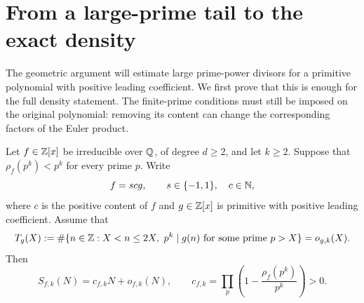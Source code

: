 \section{From a large-prime tail to the exact density}
\label{sec:sieve}

The geometric argument will estimate large prime-power divisors for a
primitive polynomial with positive leading coefficient. We first prove
that this is enough for the full density statement. The finite-prime
conditions must still be imposed on the original polynomial: removing
its content can change the corresponding factors of the Euler product.

\begin{proposition}\label{prop:sieve-transfer}
Let $f\in\mathbb Z[x]$ be irreducible over $\mathbb Q$, of degree $d\ge2$, and let
$k\ge2$. Suppose that $\rho_f(p^k)<p^k$ for every prime $p$.
Write
\[
 f=s c g,\qquad s\in\{-1,1\},\quad c\in\mathbb N,
\]
where $c$ is the positive content of $f$ and $g\in\mathbb Z[x]$ is primitive
with positive leading coefficient. Assume that
\begin{equation}
 T_g(X):=\#\{n\in\mathbb Z:X<n\le2X,\ p^k\mid g(n)
                 \text{ for some prime }p>X\}=o_{g,k}(X).
 \label{eq:sieve-tail-hypothesis}
\end{equation}
Then
\[
 S_{f,k}(N)=c_{f,k}N+o_{f,k}(N),\qquad
 c_{f,k}=\prod_p\left(1-\frac{\rho_f(p^k)}{p^k}\right)>0.
\]
\end{proposition}

